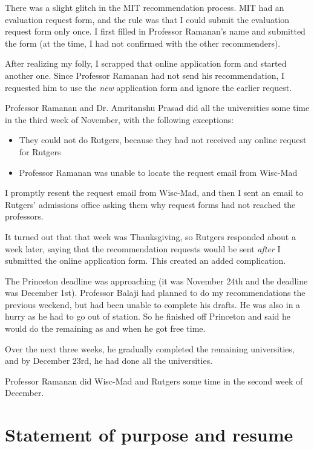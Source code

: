 \documentclass[a4paper]{amsart}
\begin{document}
There was a slight glitch in the MIT recommendation process. MIT had
an evaluation request form, and the rule was that I could submit the
evaluation request form only once. I first filled in Professor
Ramanan's name and submitted the form (at the time, I had not
confirmed with the other recommenders).

After realizing my folly, I scrapped that online application form and
started another one. Since Professor Ramanan had not send his
recommendation, I requested him to use the {\em new} application form
and ignore the earlier request.
 
Professor Ramanan and Dr. Amritanshu Prasad did all the universities some time
in the third week of November, with the following exceptions:

\begin{itemize}

\item They could not do Rutgers, because they had not received any online
  request for Rutgers

\item Professor Ramanan was unable to locate the request email from Wisc-Mad

\end{itemize}

I promptly resent the request email from Wisc-Mad, and then I sent an email
to Rutgers' admissions office asking them why request forms had not
reached the professors.

It turned out that that week was Thanksgiving, so Rutgers responded
about a week later, saying that the recommendation requests would be sent
{\em after} I submitted the online application form. This created
an added complication.

The Princeton deadline was approaching (it was November 24th and the
deadline was December 1st). Professor Balaji had planned to do my
recommendations the previous weekend, but had been unable to complete
his drafts. He was also in a hurry as he had to go out of station.
So he finished off Princeton and said he would do the remaining as and 
when he got free time.

Over the next three weeks, he gradually completed the remaining universities,
and by December 23rd, he had done all the universities.

Professor Ramanan did Wisc-Mad and Rutgers some time in the second
week of December.

\section{Statement of purpose and resume}
\end{document}
